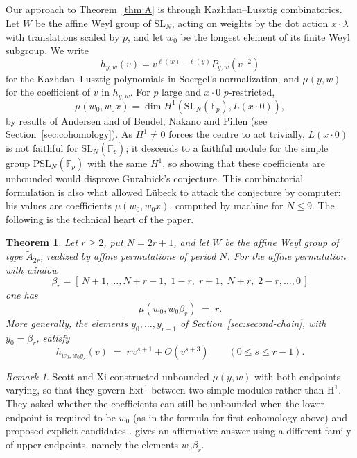 \documentclass[11pt,a4paper,reqno]{amsart}
\numberwithin{equation}{section}
\newtheorem{maintheorem}{Theorem}
\theoremstyle{definition}
\theoremstyle{remark}
\newtheorem{remark}[theorem]{Remark}
\theoremstyle{plain}
\begin{document}
 
\subsection{}
Our approach to Theorem~\ref{thm:A} is through Kazhdan--Lusztig combinatorics.
Let $W$ be the affine Weyl group of $\mathrm{SL}_N$, acting on weights by the
dot action $x\cdot\lambda$ with translations scaled by $p$, and let $w_0$ be
the longest element of its finite Weyl subgroup. We write
$$h_{y,w}(v)=v^{\ell(w)-\ell(y)}P_{y,w}(v^{-2})$$ for the Kazhdan--Lusztig
polynomials in Soergel's normalization, and $\mu(y,w)$ for the coefficient of
$v$ in $h_{y,w}$. For $p$ large and $x\cdot0$ $p$-restricted,
\begin{equation}
  \mu(w_0,w_0x)=\dim H^1(\mathrm{SL}_N(\mathbb F_p),L(x\cdot0))  ,
\end{equation}
by results of
Andersen and of Bendel, Nakano and Pillen (see Section~\ref{sec:cohomology}). As $H^1\ne0$ forces the centre to act trivially, $L(x\cdot0)$ is not
faithful for $\mathrm{SL}_N(\mathbb F_p)$; it descends to a faithful module
for the simple group $\mathrm{PSL}_N(\mathbb F_p)$ with the same $H^1$, so showing that these coefficients are unbounded would disprove Guralnick's conjecture.
This combinatorial formulation is also what allowed L\"ubeck to attack the
conjecture by computer: his values are coefficients $\mu(w_0,w_0x)$, computed by machine for $N\le9$. The following is the technical heart of the paper.
 


 

 \begin{maintheorem}
\label{thm:B}
\label{thm:mu}
\label{thm:main}
Let $r\ge2$, put $N=2r+1$, and let $W$ be the affine Weyl group of type
$\widetilde A_{2r}$, realized by affine permutations of period $N$.
For the affine permutation with window
\[
\beta_r=
[\,N+1,\dots,N+r-1,\;1-r,\;r+1,\;N+r,\;2-r,\dots,0\,]
\]
one has
\[
\mu(w_0,w_0\beta_r)\;=\;r.
\]
More generally, the elements $y_0,\dots,y_{r-1}$ of
Section~\ref{sec:second-chain}, with $y_0=\beta_r$, satisfy
\[
h_{w_0,w_0y_s}(v)
\;=\;r\,v^{s+1}+O(v^{s+3})
\qquad(0\le s\le r-1).
\]
\end{maintheorem}


\begin{remark}
Scott and Xi constructed unbounded $\mu(y,w)$ with both endpoints varying, so that they govern $\mathrm{Ext}^1$ between two simple modules rather than $\mathrm{H}^1$.
They asked whether the coefficients can still
be unbounded when the lower endpoint is required to be $w_0$ (as in
the formula for first cohomology above) and proposed explicit candidates
\cite[Section~4]{ScottXi}.
 gives an affirmative answer using a different family of upper endpoints,
namely the elements $w_0\beta_r$. 
\end{remark}
\end{document}
